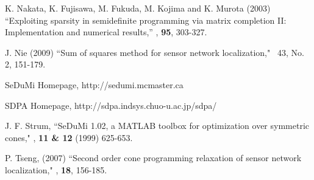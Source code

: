 \documentclass[12pt]{article}
\begin{document}
\begin{thebibliography}{99}
 K. Nakata, K. Fujisawa, M. Fukuda, M. Kojima and K. Murota (2003)
\newblock ``Exploiting sparsity in semidefinite programming via matrix completion II:
Implementation and numerical results,''
,
{\bf 95},  303-327.

 
 J. Nie (2009)
\newblock ``Sum of squares method for sensor network localization,"
  {\ 43}, No. 2, 151-179.
 


 

 SeDuMi Homepage, http://sedumi.mcmaster.ca\/

 SDPA Homepage, http://sdpa.indsys.chuo-u.ac.jp/sdpa/

J. F. Strum, 
\newblock ``SeDuMi 1.02, a MATLAB toolbox for optimization over symmetric cones,"
, {\bf 11 \& 12} (1999) 625-653.

 P. Tseng, (2007)
\newblock ``Second order cone programming relaxation of sensor network localization,"
, {\bf 18}, 156-185.





\end{thebibliography}
\end{document}
